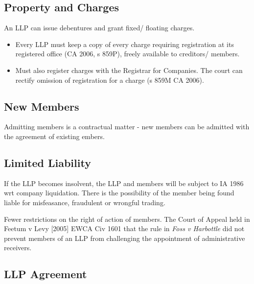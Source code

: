 \documentclass[
]{article}
\providecommand{\tightlist}{%
  \setlength{\itemsep}{0pt}\setlength{\parskip}{0pt}}
\begin{document}
\hypertarget{property-and-charges}{%
\subsection{Property and Charges}\label{property-and-charges}}

An LLP can issue debentures and grant fixed/ floating charges.

\begin{itemize}
\tightlist
\item
  Every LLP must keep a copy of every charge requiring registration at
  its registered office (CA 2006, s 859P), freely available to
  creditors/ members.
\item
  Must also register charges with the Registrar for Companies. The court
  can rectify omission of registration for a charge (s 859M CA 2006).
\end{itemize}

\hypertarget{new-members}{%
\subsection{New Members}\label{new-members}}

Admitting members is a contractual matter - new members can be admitted
with the agreement of existing embers.

\hypertarget{limited-liability}{%
\subsection{Limited Liability}\label{limited-liability}}

If the LLP becomes insolvent, the LLP and members will be subject to IA
1986 wrt company liquidation. There is the possibility of the member
being found liable for misfeasance, fraudulent or wrongful trading.

Fewer restrictions on the right of action of members. The Court of
Appeal held in Feetum v Levy {[}2005{]} EWCA Civ 1601 that the rule in
\emph{Foss v Harbottle} did not prevent members of an LLP from
challenging the appointment of administrative receivers.

\hypertarget{llp-agreement}{%
\subsection{LLP Agreement}\label{llp-agreement}}
\end{document}
